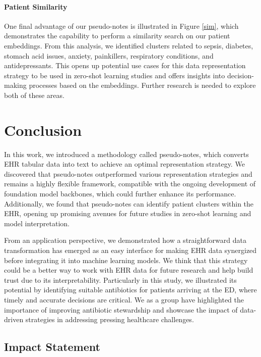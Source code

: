 \documentclass{article}
\theoremstyle{plain}
\theoremstyle{definition}
\theoremstyle{remark}
\begin{document}
\paragraph{Patient Similarity}
One final advantage of our pseudo-notes is illustrated in Figure \ref{sim}, which demonstrates the capability to perform a similarity search on our patient embeddings. From this analysis, we identified clusters related to sepsis, diabetes, stomach acid issues, anxiety, painkillers, respiratory conditions, and antidepressants. This opens up potential use cases for this data representation strategy to be used in zero-shot learning studies and offers insights into decision-making processes based on the embeddings. Further research is needed to explore both of these areas.

\section{Conclusion}

In this work, we introduced a methodology called pseudo-notes, which converts EHR tabular data into text to achieve an optimal representation strategy. We discovered that pseudo-notes outperformed various representation strategies and remains a highly flexible framework, compatible with the ongoing development of foundation model backbones, which could further enhance its performance. Additionally, we found that pseudo-notes can identify patient clusters within the EHR, opening up promising avenues for future studies in zero-shot learning and model interpretation.

From an application perspective, we demonstrated how a straightforward data transformation has emerged as an easy interface for making EHR data synergized before integrating it into machine learning models. We think that this strategy could be a better way to work with EHR data for future research and help build trust due to its interpretability. Particularly in this study, we illustrated its potential by identifying suitable antibiotics for patients arriving at the ED, where timely and accurate decisions are critical. We as a group have highlighted the importance of improving antibiotic stewardship and showcase the impact of data-driven strategies in addressing pressing healthcare challenges.

\subsection*{Impact Statement}
\end{document}
